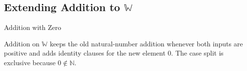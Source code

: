 
\subsection{Extending Addition to \texorpdfstring{$\mathbb{W}$}{W}}
\label{sec:extending-addition-to-w}
\begin{topicbox}{Addition with Zero}
\begin{exposition}
Addition on $\mathbb{W}$ keeps the old natural-number addition whenever both
inputs are positive and adds identity clauses for the new element $0$. The
case split is exclusive because $0\notin\mathbb{N}$.
\end{exposition}
\end{topicbox}
